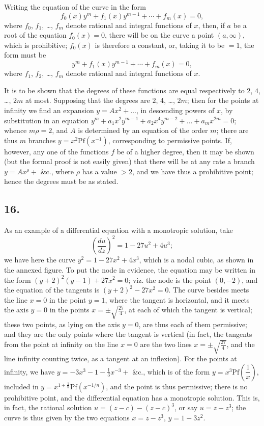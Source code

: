 \documentclass[11pt,a4paper]{book}
\providecommand{\Pf}{\mathrm{Pf}}
\begin{document}
Writing the equation of the curve in the form
\[
f_0(x)y^m + f_1(x)y^{m-1} + \cdots + f_m(x) = 0,
\]
where $f_0$, $f_1$, \ldots, $f_m$ denote rational and integral functions of $x$, then, if $a$ be a root of the equation $f_0(x) = 0$, there will be on the curve a point $(a, \infty)$, which is prohibitive; $f_0(x)$ is therefore a constant, or, taking it to be $= 1$, the form must be
\[
y^m + f_1(x)y^{m-1} + \cdots + f_m(x) = 0,
\]
where $f_1$, $f_2$, \ldots, $f_m$ denote rational and integral functions of $x$.

It is to be shown that the degrees of these functions are equal respectively to $2$, $4$, \ldots, $2m$ at most. Supposing that the degrees are $2$, $4$, \ldots, $2m$; then for the points at infinity we find an expansion $y = Ax^2 + \ldots$, in descending powers of $x$, by substitution in an equation $y^m + a_1 x^2 y^{m-1} + a_2 x^4 y^{m-2} + \ldots + a_m x^{2m} = 0$; whence $m\rho = 2$, and $A$ is determined by an equation of the order $m$; there are thus $m$ branches $y = x^2 \Pf(x^{-1})$, corresponding to permissive points. If, however, any one of the functions $f$ be of a higher degree, then it may be shown (but the formal proof is not easily given) that there will be at any rate a branch $y = Ax^\rho +$ \&c., where $\rho$ has a value $> 2$, and we have thus a prohibitive point; hence the degrees must be as stated.

\subsection*{16.}

As an example of a differential equation with a monotropic solution, take
\[
\left(\frac{du}{dz}\right)^2 = 1 - 27u^2 + 4u^3;
\]
we have here the curve $y^2 = 1 - 27x^2 + 4x^3$, which is a nodal cubic, as shown in the annexed figure. To put the node in evidence, the equation may be written in the form $(y + 2)^2(y - 1) + 27x^2 = 0$; viz. the node is the point $(0, -2)$, and the equation of the tangents is $(y + 2)^2 - 27x^2 = 0$. The curve besides meets the line $x = 0$ in the point $y = 1$, where the tangent is horizontal, and it meets the axis $y = 0$ in the points $x = \pm\sqrt{\frac{27}{4}}$, at each of which the tangent is vertical; these two points, as lying on the axis $y = 0$, are thus each of them permissive; and they are the only points where the tangent is vertical (in fact, the tangents from the point at infinity on the line $x = 0$ are the two lines $x = \pm\sqrt{\frac{27}{4}}$, and the line infinity counting twice, as a tangent at an inflexion). For the points at infinity, we have $y = -3x^3 - 1 - \tfrac{1}{3}x^{-3} +$ \&c., which is of the form $y = x^3 \Pf\left(\dfrac{1}{x}\right)$, included in $y = x^{1 + \frac{1}{n}} \Pf(x^{-1/n})$, and the point is thus permissive; there is no prohibitive point, and the differential equation has a monotropic solution. This is, in fact, the rational solution $u = (z - c) - (z - c)^3$, or say $u = z - z^3$; the curve is thus given by the two equations $x = z - z^3$, $y = 1 - 3z^2$.
\end{document}
